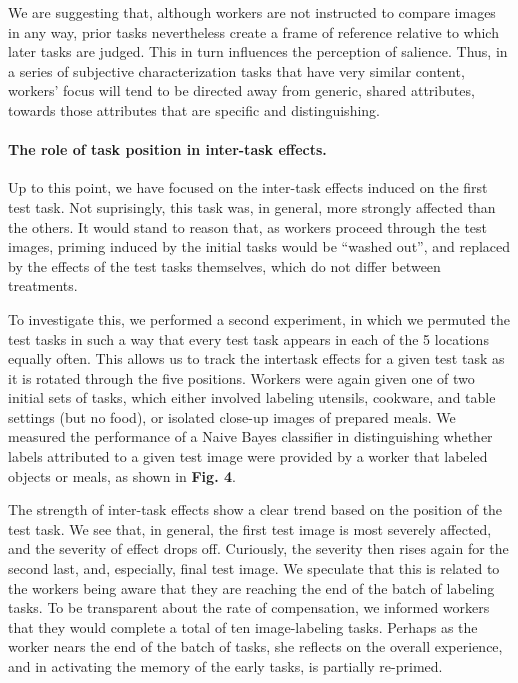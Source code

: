 \documentclass[12pt]{article}
\begin{document}
We are suggesting that, although workers are not instructed to compare images 
in any way, prior tasks nevertheless create a frame of reference relative to 
which later tasks are judged. This in turn influences the perception of 
salience. Thus, in a series of subjective characterization tasks that have 
very similar content, workers' focus will tend to be directed away from 
generic, shared attributes, towards those attributes that are specific and 
distinguishing.

\paragraph{The role of task position in inter-task effects.}
Up to this point, we have focused on the inter-task effects induced on 
the first test task.  Not suprisingly, this task was, in general, more 
strongly affected than the others.  It would stand to reason that, as workers 
proceed through the test images, priming induced by the initial tasks would
be ``washed out'', and replaced by the effects of the test tasks themselves,
which do not differ between treatments.

To investigate this, we performed a second experiment, in which we permuted
the test tasks in such a way that every test task appears in each of the
5 locations equally often.  This allows us to track the intertask effects for
a given test task as it is rotated through the five positions.  Workers were
again given one of two initial sets of tasks, which either involved labeling
utensils, cookware, and table settings (but no food), or isolated close-up
images of prepared meals.  We measured the performance of a Naive Bayes 
classifier in distinguishing whether labels attributed to a given test 
image were provided by a worker that labeled objects or meals, as shown in 
\textbf{Fig. 4}.

The strength of inter-task effects show a clear trend based on the position of
the test task.  We see that, in general, the first test image is most severely
affected, and the severity of effect drops off.  Curiously, the severity then
rises again for the second last, and, especially, final test image.  We 
speculate that this is related to the workers being aware that they are 
reaching the end of the batch of labeling tasks.  To be transparent about the
rate of compensation, we informed workers that they would complete a total
of ten image-labeling tasks.  Perhaps as the worker nears the end of the batch
of tasks, she reflects on the overall experience, and in activating the
memory of the early tasks, is partially re-primed.
\end{document}
